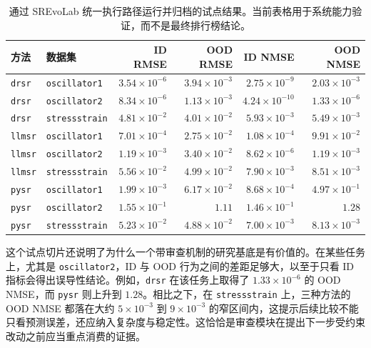 \documentclass[UTF8]{ctexart}
\begin{document}
\begin{table}[t]
\centering
\scriptsize
\begin{tabular}{llrrrr}
\toprule
方法 & 数据集 & ID RMSE & OOD RMSE & ID NMSE & OOD NMSE \\
\midrule
\texttt{drsr} & \texttt{oscillator1} & $3.54\times 10^{-6}$ & $3.94\times 10^{-3}$ & $2.75\times 10^{-9}$ & $2.03\times 10^{-3}$ \\
\texttt{drsr} & \texttt{oscillator2} & $8.34\times 10^{-6}$ & $1.13\times 10^{-3}$ & $4.24\times 10^{-10}$ & $1.33\times 10^{-6}$ \\
\texttt{drsr} & \texttt{stressstrain} & $4.81\times 10^{-2}$ & $4.01\times 10^{-2}$ & $5.93\times 10^{-3}$ & $5.49\times 10^{-3}$ \\
\texttt{llmsr} & \texttt{oscillator1} & $7.01\times 10^{-4}$ & $2.75\times 10^{-2}$ & $1.08\times 10^{-4}$ & $9.91\times 10^{-2}$ \\
\texttt{llmsr} & \texttt{oscillator2} & $1.19\times 10^{-3}$ & $3.40\times 10^{-2}$ & $8.62\times 10^{-6}$ & $1.19\times 10^{-3}$ \\
\texttt{llmsr} & \texttt{stressstrain} & $5.56\times 10^{-2}$ & $4.99\times 10^{-2}$ & $7.90\times 10^{-3}$ & $8.51\times 10^{-3}$ \\
\texttt{pysr} & \texttt{oscillator1} & $1.99\times 10^{-3}$ & $6.17\times 10^{-2}$ & $8.68\times 10^{-4}$ & $4.97\times 10^{-1}$ \\
\texttt{pysr} & \texttt{oscillator2} & $1.55\times 10^{-1}$ & $1.11$ & $1.46\times 10^{-1}$ & $1.28$ \\
\texttt{pysr} & \texttt{stressstrain} & $5.23\times 10^{-2}$ & $4.88\times 10^{-2}$ & $7.00\times 10^{-3}$ & $8.13\times 10^{-3}$ \\
\bottomrule
\end{tabular}
\caption{通过 SREvoLab 统一执行路径运行并归档的试点结果。当前表格用于系统能力验证，而不是最终排行榜结论。}
\label{tab:pilot-slice}
\end{table}

这个试点切片还说明了为什么一个带审查机制的研究基底是有价值的。在某些任务上，尤其是 \texttt{oscillator2}，ID 与 OOD 行为之间的差距足够大，以至于只看 ID 指标会得出误导性结论。例如，\texttt{drsr} 在该任务上取得了 $1.33\times 10^{-6}$ 的 OOD NMSE，而 \texttt{pysr} 则上升到 $1.28$。相比之下，在 \texttt{stressstrain} 上，三种方法的 OOD NMSE 都落在大约 $5\times 10^{-3}$ 到 $9\times 10^{-3}$ 的窄区间内，这提示后续比较不能只看预测误差，还应纳入复杂度与稳定性。这恰恰是审查模块在提出下一步受约束改动之前应当重点消费的证据。
\end{document}

